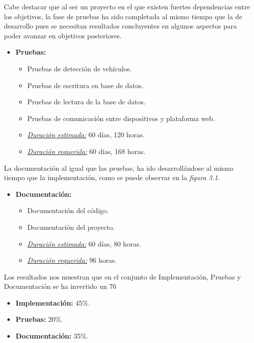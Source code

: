 Cabe destacar que al ser un proyecto en el que existen fuertes dependencias entre los objetivos, la fase de pruebas ha sido completada al mismo tiempo que la de desarrollo pues se necesitan resultados concluyentes en algunos aspectos para poder avanzar en objetivos posteriores.

\begin{itemize}
 \item \textbf{Pruebas:}
 \begin{itemize}
  \item Pruebas de detección de vehículos.
  \item Pruebas de escritura en base de datos.
  \item Pruebas de lectura de la base de datos.
  \item Pruebas de comunicación entre dispositivos y plataforma web.
  \item \underline{\textit{Duración estimada:}} 60 días, 120 horas.
  \item \underline{\textit{Duración requerida:}} 60 días, 168 horas.
 \end{itemize}
\end{itemize}

La documentación al igual que las pruebas, ha ido desarrollándose al mismo tiempo que la implementación, como se puede observar en la \textit{figura 3.1}.

\begin{itemize}
 \item \textbf{Documentación:}
 \begin{itemize}
  \item Documentación del código.
  \item Documentación del proyecto.
  \item \underline{\textit{Duración estimada:}} 60 días, 80 horas.
  \item \underline{\textit{Duración requerida:}} 96 horas.
 \end{itemize}
\end{itemize}

\bigskip

Los resultados nos muestran que en el conjunto de Implementación, Pruebas y Documentación se ha invertido un 76%

\begin{itemize}
  \item \textbf{Implementación: }45\%.
  \item \textbf{Pruebas: }20\%.
  \item \textbf{Documentación: }35\%.
\end{itemize}

